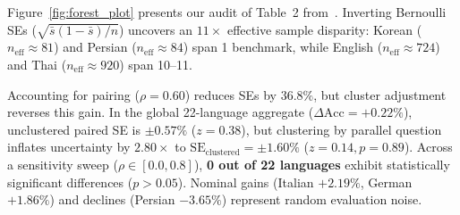 Figure~\ref{fig:forest_plot} presents our audit of Table~2 from~\cite{foroutan2026parity}. Inverting Bernoulli SEs ($\sqrt{\bar{s}(1-\bar{s})/n}$) uncovers an $11\times$ effective sample disparity: Korean ($n_{\mathrm{eff}} \approx 81$) and Persian ($n_{\mathrm{eff}} \approx 84$) span 1 benchmark, while English ($n_{\mathrm{eff}} \approx 724$) and Thai ($n_{\mathrm{eff}} \approx 920$) span 10--11.

Accounting for pairing ($\rho = 0.60$) reduces SEs by $36.8\%$, but cluster adjustment reverses this gain. In the global 22-language aggregate ($\Delta\mathrm{Acc} = +0.22\%$), unclustered paired SE is $\pm 0.57\%$ ($z = 0.38$), but clustering by parallel question inflates uncertainty by $\mathbf{2.80\times}$ to $\mathrm{SE}_{\mathrm{clustered}} = \pm 1.60\%$ ($z = 0.14, p = 0.89$). Across a sensitivity sweep ($\rho \in [0.0, 0.8]$), \textbf{0 out of 22 languages} exhibit statistically significant differences ($p > 0.05$). Nominal gains (Italian $+2.19\%$, German $+1.86\%$) and declines (Persian $-3.65\%$) represent random evaluation noise.
